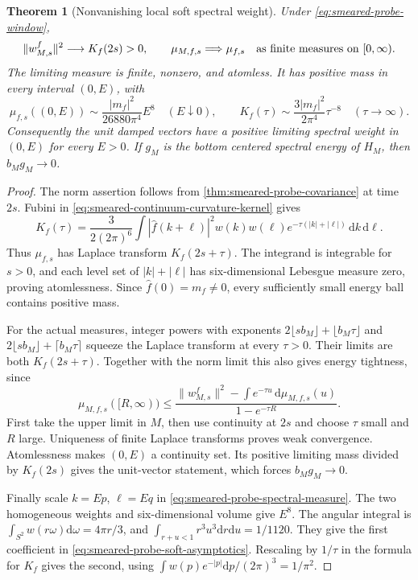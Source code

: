 \documentclass[11pt,oneside,openany]{book}
\newtheorem{theorem}{Theorem}[chapter]
\theoremstyle{definition}
\theoremstyle{remark}
\newcommand{\dd}{\mathrm d}
\begin{document}
\begin{theorem}[Nonvanishing local soft spectral weight]
\label{thm:smeared-probe-spectrum}
Under \cref{eq:smeared-probe-window},
\begin{equation}
 \|w_{M,s}^f\|^2\longrightarrow K_f(2s)>0,
 \qquad \mu_{M,f,s}\Longrightarrow\mu_{f,s}
 \quad\hbox{as finite measures on }[0,\infty).
 \label{eq:smeared-probe-spectral-convergence}
\end{equation}
The limiting measure is finite, nonzero, and atomless. It has
positive mass in every interval $(0,E)$, with
\begin{equation}
 \mu_{f,s}((0,E))\sim\frac{|m_f|^2}{26880\pi^4}E^8
       \quad(E\downarrow0),
 \qquad
 K_f(\tau)\sim\frac{3|m_f|^2}{2\pi^4}\tau^{-8}
       \quad(\tau\to\infty).
 \label{eq:smeared-probe-soft-asymptotics}
\end{equation}
Consequently the unit damped vectors have a positive limiting
spectral weight in $(0,E)$ for every $E>0$. If $g_M$ is the
bottom centered spectral energy of $H_M$, then $b_Mg_M\to0$.
\end{theorem}
\begin{proof}
The norm assertion follows from
\cref{thm:smeared-probe-covariance} at time $2s$.
Fubini in \cref{eq:smeared-continuum-curvature-kernel} gives
\[
 K_f(\tau)=\frac3{2(2\pi)^6}\int
  |\widehat f(k+\ell)|^2w(k)w(\ell)
                         e^{-\tau(|k|+|\ell|)}\,\dd k\,\dd\ell.
\]
Thus $\mu_{f,s}$ has Laplace transform $K_f(2s+\tau)$.
The integrand is integrable for $s>0$, and each level set of
$|k|+|\ell|$ has six-dimensional Lebesgue measure zero, proving
atomlessness. Since $\widehat f(0)=m_f\ne0$, every sufficiently
small energy ball contains positive mass.

For the actual measures, integer powers with exponents
$2\lfloor sb_M\rfloor+\lfloor b_M\tau\rfloor$ and
$2\lfloor sb_M\rfloor+\lceil b_M\tau\rceil$ squeeze the
Laplace transform at every $\tau>0$. Their limits are both
$K_f(2s+\tau)$. Together with the norm limit this also gives
energy tightness, since
\[
 \mu_{M,f,s}([R,\infty))\le
 \frac{\|w_{M,s}^f\|^2-
            \int e^{-\tau u}\,\dd\mu_{M,f,s}(u)}
      {1-e^{-\tau R}}.
\]
First take the upper limit in $M$, then use continuity at $2s$
and choose $\tau$ small and $R$ large. Uniqueness of finite
Laplace transforms proves weak convergence. Atomlessness makes
$(0,E)$ a continuity set. Its positive limiting mass divided by
$K_f(2s)$ gives the unit-vector statement, which forces
$b_Mg_M\to0$.

Finally scale $k=Ep$, $\ell=Eq$ in
\cref{eq:smeared-probe-spectral-measure}. The two homogeneous
weights and six-dimensional volume give $E^8$.
The angular integral is $\int_{S^2}w(r\omega)\dd\omega=4\pi r/3$,
and $\int_{r+u<1}r^3u^3\dd r\dd u=1/1120$.
They give the first coefficient in
\cref{eq:smeared-probe-soft-asymptotics}. Rescaling by $1/\tau$
in the formula for $K_f$ gives the second, using
$\int w(p)e^{-|p|}\dd p/(2\pi)^3=1/\pi^2$.
\end{proof}
\end{document}
